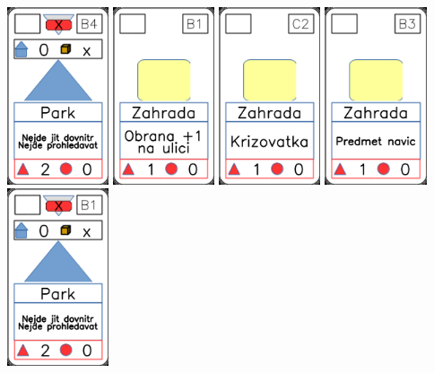 \documentclass[a4paper]{article}
\begin{document}
	\includegraphics[width=3.0cm]{img-3_23}
	\includegraphics[width=3.0cm]{img-2_20}
	\includegraphics[width=3.0cm]{img-2_26}
	\includegraphics[width=3.0cm]{img-2_22}
	\includegraphics[width=3.0cm]{img-3_20}
\end{document}
